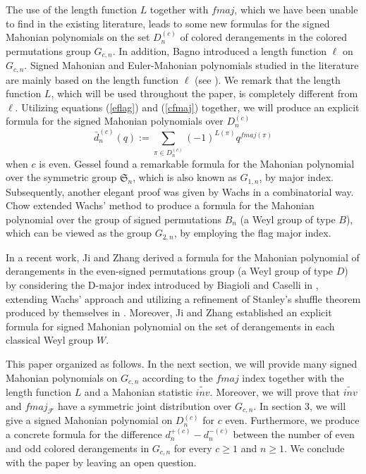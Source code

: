 \documentclass[a4paper,12pt]{article}
\begin{document}
The use of the length function $L$ together with $fmaj$, which we have been unable to find in the existing literature, leads to some new formulas for the signed Mahonian polynomials on the set $D_n^{(c)}$ of colored derangements in the colored permutations group $G_{c,n}$. In addition, Bagno \cite{bagno2004} introduced a length function $\ell$ on $G_{c,n}$. Signed Mahonian and Euler-Mahonian polynomials studied in the literature are mainly based on the length function $\ell$ (see \cite{chang2021, eu2021}). We remark that the length function $L$, which will be used throughout the paper, is completely different from $\ell$. Utilizing equations (\ref{eflag}) and (\ref{cfmaj}) together, we will produce an explicit formula for the signed Mahonian polynomials over $D_{n}^{(c)}$
\begin{equation}\label{scfmaj}
     \bar{d}_n^{(c)}(q):=\sum_{\pi \in D_{n}^{(c)}}(-1)^{L(\pi)}q^{fmaj(\pi)}
\end{equation}
when $c$ is even.
Gessel \cite{gessel1993} found a remarkable formula for the Mahonian polynomial over the symmetric group $\mathfrak{S}_n$, which is also known as $G_{1,n}$, by major index. Subsequently, another elegant proof was given by Wachs \cite{wachs1989} in a combinatorial way. Chow \cite{chow2006} extended Wachs' method to produce a formula for the Mahonian polynomial over the group of signed permutations $B_n$ (a Weyl group of type $B$), which can be viewed as the group $G_{2,n}$, by employing the flag major index.

In a recent work, Ji and Zhang \cite{ji2025} derived a formula for the Mahonian polynomial of derangements in the even-signed permutations group (a Weyl group of type $D$) by considering the D-major index introduced by Biagioli and Caselli in \cite{biagioli2004},  extending Wachs' approach and utilizing a refinement of Stanley's shuffle theorem produced by themselves in \cite{ji2024}. Moreover, Ji and Zhang \cite{ji2025} established an explicit formula for signed Mahonian polynomial on the set of derangements in each classical Weyl group $W$. 

This paper organized as follows. In the next section, we will provide many signed Mahonian polynomials on $G_{c,n}$ according to the $fmaj$ index together with the length function $L$ and a Mahonian statistic $\widetilde{inv}$. Moreover, we will prove that $\widetilde{inv}$ and $fmaj_{\mathcal{F}}$ have a symmetric joint distribution over $G_{c,n}$. In section 3, we will give a signed Mahonian polynomial on $D_{n}^{(c)}$ for $c$ even. Furthermore, we produce a concrete formula for the difference $d_{n}^{+(c)}-d_{n}^{-(c)}$ between the number of even and odd colored derangements in $G_{c,n}$ for every $c \geq 1$ and $n \geq 1$. We conclude with the paper by leaving an open question.
\end{document}
